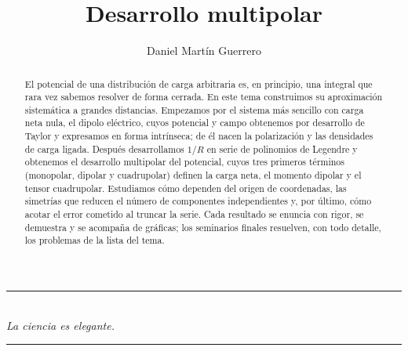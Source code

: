 \documentclass[a4paper,11pt]{amsart}
\title{Desarrollo multipolar}
\author{Daniel Martín Guerrero}
\date{}
\begin{document}

\clearpage
{}
\setcounter{page}{1}

\begin{abstract}
El potencial de una distribución de carga arbitraria es, en principio, una integral que rara vez
sabemos resolver de forma cerrada. En este tema construimos su aproximación sistemática a grandes
distancias. Empezamos por el sistema más sencillo con carga neta nula, el dipolo eléctrico, cuyos
potencial y campo obtenemos por desarrollo de Taylor y expresamos en forma intrínseca; de él
nacen la polarización y las densidades de carga ligada. Después desarrollamos $1/R$ en serie de
polinomios de Legendre y obtenemos el desarrollo multipolar del potencial, cuyos tres primeros
términos (monopolar, dipolar y cuadrupolar) definen la carga neta, el momento dipolar y el tensor
cuadrupolar. Estudiamos cómo dependen del origen de coordenadas, las simetrías que reducen el número
de componentes independientes y, por último, cómo acotar el error cometido al truncar la serie.
Cada resultado se enuncia con rigor, se demuestra y se acompaña de gráficas; los seminarios finales
resuelven, con todo detalle, los problemas de la lista del tema.
\end{abstract}

\maketitle
\tableofcontents









\printbibliography[title={Referencias}]

\vspace*{\fill}
\begin{center}
  {\color{magacero}\rule{2.4cm}{0.5pt}}\\[10pt]
  {\color{magprof}\large\itshape La ciencia es elegante.}\\[10pt]
  {\color{magacero}\rule{2.4cm}{0.5pt}}
\end{center}
\vspace*{\fill}
\end{document}
